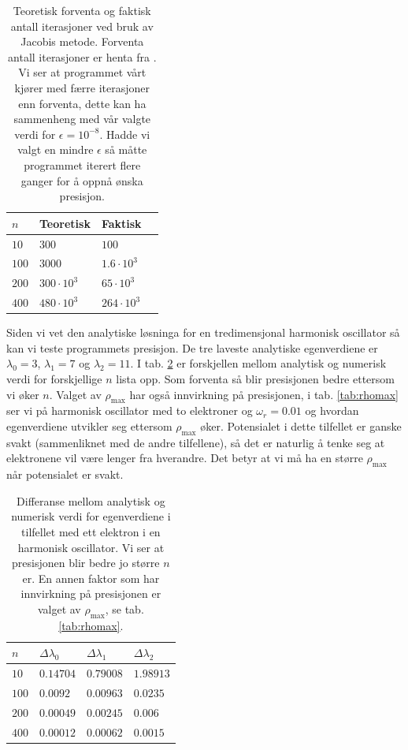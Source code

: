 \documentclass[norsk, 12pt]{article}
\theoremstyle{definition} \newtheorem{defi}{Definisjon}[subsection]
\theoremstyle{definition} \newtheorem{teo}{Teorem}[subsection]
\theoremstyle{definition} \newtheorem*{eks}{Eksempel}
\begin{document}
\begin{table}[H]
  \centering
  \begin{tabular}{ l l l l }
    \toprule
    $n$ & Teoretisk & Faktisk \\
    \midrule
	$10$ & $300$ & $100$ \\
	$100$ & $3000$ & $1.6\cdot10^3$ \\
	$200$ & $300\cdot10^3$ & $65\cdot10^3$ \\
	$400$ & $480\cdot10^3$ & $264\cdot10^3$ \\
	\bottomrule
  \end{tabular}
  \caption{Teoretisk forventa og faktisk antall iterasjoner ved bruk av Jacobis metode. Forventa antall iterasjoner er henta fra \cite[p.217]{MHJ15}. Vi ser at programmet vårt kjører med færre iterasjoner enn forventa, dette kan ha sammenheng med vår valgte verdi for $\epsilon = 10^{-8}$. Hadde vi valgt en mindre $\epsilon$ så måtte programmet iterert flere ganger for å oppnå ønska presisjon.}
  \label{tab:ant_iterasjoner}
\end{table}

Siden vi vet den analytiske løsninga for en tredimensjonal harmonisk oscillator så kan vi teste programmets presisjon. De tre laveste analytiske egenverdiene er $\lambda_0= 3$, $\lambda_1=7$ og $\lambda_2 = 11$. I tab. \ref{tab:presisjon} er forskjellen mellom analytisk og numerisk verdi for forskjellige $n$ lista opp. Som forventa så blir presisjonen bedre ettersom vi øker $n$. Valget av $\rho_\text{max}$ har også innvirkning på presisjonen, i tab. \ref{tab:rhomax} ser vi på harmonisk oscillator med to elektroner og $\omega_r = 0.01$ og hvordan egenverdiene utvikler seg ettersom $\rho_\text{max}$ øker. Potensialet i dette tilfellet er ganske svakt (sammenliknet med de andre tilfellene), så det er naturlig å tenke seg at elektronene vil være lenger fra hverandre. Det betyr at vi må ha en større $\rho_\text{max}$ når potensialet er svakt.

\begin{table}[H]
  \centering
  \begin{tabular}{ l l l l }
    \toprule
    $n$ & $\Delta\lambda_0$ & $\Delta\lambda_1$ & $\Delta\lambda_2$ \\
    \midrule
	$10$ & $0.14704$ & $0.79008$ & $1.98913$ \\
	$100$ & $0.0092$ & $0.00963$ & $0.0235$ \\
	$200$ & $0.00049$ & $0.00245$ & $0.006$ \\
	$400$ & $0.00012$ & $0.00062$ & $0.0015$ \\
	\bottomrule
  \end{tabular}
  \caption{Differanse mellom analytisk og numerisk verdi for egenverdiene i tilfellet med ett elektron i en harmonisk oscillator. Vi ser at presisjonen blir bedre jo større $n$ er. En annen faktor som har innvirkning på presisjonen er valget av $\rho_\text{max}$, se tab. \ref{tab:rhomax}.}
  \label{tab:presisjon}
\end{table}
\end{document}

